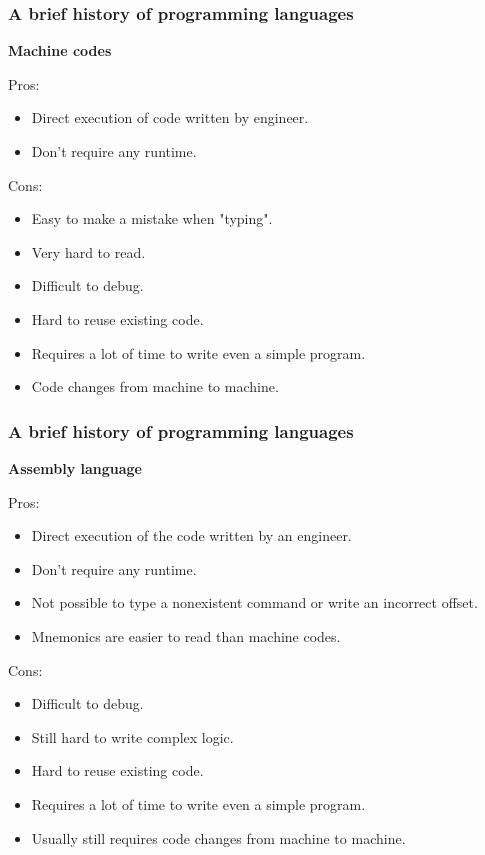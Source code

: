 \documentclass[aspectratio=1610,t]{beamer}
\begin{document}

\begin{frame}
\frametitle{A brief history of programming languages}
\textbf{Machine codes}

Pros:
\begin{itemize}
    \item Direct execution of code written by engineer.
    \item Don't require any runtime.
\end{itemize}

Cons:
\begin{itemize}
    \item Easy to make a mistake when "typing".
    \item Very hard to read.
    \item Difficult to debug.
    \item Hard to reuse existing code.
    \item Requires a lot of time to write even a simple program.
    \item Code changes from machine to machine.
\end{itemize}
\end{frame}


\begin{frame}
\frametitle{A brief history of programming languages}
\textbf{Assembly language}

Pros:
\begin{itemize}
    \item Direct execution of the code written by an engineer.
    \item Don't require any runtime.
    \item Not possible to type a nonexistent command or write an incorrect offset.
    \item Mnemonics are easier to read than machine codes.
\end{itemize}

Cons:
\begin{itemize}
    \item Difficult to debug.
    \item Still hard to write complex logic.
    \item Hard to reuse existing code.
    \item Requires a lot of time to write even a simple program.
    \item Usually still requires code changes from machine to machine.
\end{itemize}
\end{frame}
\end{document}
